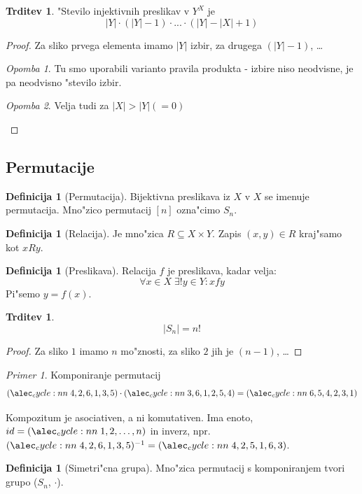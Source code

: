\documentclass[a4paper,12pt]{article}
\theoremstyle{definition}
\newtheorem{defn}[counter]{Definicija}
\newtheorem{claim}[counter]{Trditev}
\theoremstyle{remark}
\newtheorem*{ex}{Primer}
\newtheorem*{rem}{Opomba}
\begin{document}
\begin{claim}
	"Stevilo injektivnih preslikav v $Y^X$ je
	\[ |Y|\cdot(|Y| - 1)\cdot ...\cdot (|Y| - |X|+1) \]
\end{claim}
\begin{proof}
	Za sliko prvega elementa imamo $|Y|$ izbir, za drugega $(|Y| - 1)$, \ldots
	\begin{rem}
		Tu smo uporabili varianto pravila produkta - izbire niso neodvisne, je pa neodvisno "stevilo izbir.
	\end{rem}
	\begin{rem}
		Velja tudi za $|X| > |Y| (= 0)$
	\end{rem}
\end{proof}

\subsection{Permutacije}
\begin{defn}[Permutacija]
	Bijektivna preslikava iz $X$ v $X$ se imenuje permutacija.
	Mno"zico permutacij $[n]$ ozna"cimo $S_n$.
\end{defn}
\begin{defn}[Relacija]
	Je mno"zica $R \subseteq X\times Y$.
	Zapis $(x,y)\in R$ kraj"samo kot $xRy$.
\end{defn}
\begin{defn}[Preslikava]
	Relacija $f$ je preslikava, kadar velja:
	\[\forall x \in X \; \exists! y \in Y: xfy\]
	Pi"semo $y=f(x).$
\end{defn}


\begin{claim}
	\[|S_n| = n!\]
\end{claim}
\begin{proof}
	Za sliko $1$ imamo $n$ mo"znosti, za sliko $2$ jih je $(n - 1)$, \ldots
\end{proof}

\begin{ex}
	Komponiranje permutacij
	\[ \cycle{4, 2, 6, 1, 3, 5} \cdot \cycle{3,6,1,2,5,4} = \cycle{6,5,4,2,3,1} \]
\end{ex}
Kompozitum je asociativen, a ni komutativen. Ima enoto, $ id = \cycle{1,2,\ldots,n} $ in inverz, npr. $\cycle{4,2,6,1,3,5}^{-1} = \cycle{4,2,5,1,6,3}$.

\begin{defn}[Simetri"cna grupa]
	Mno"zica permutacij s komponiranjem tvori grupo ($S_n$, $\cdot$).
\end{defn}
\end{document}
